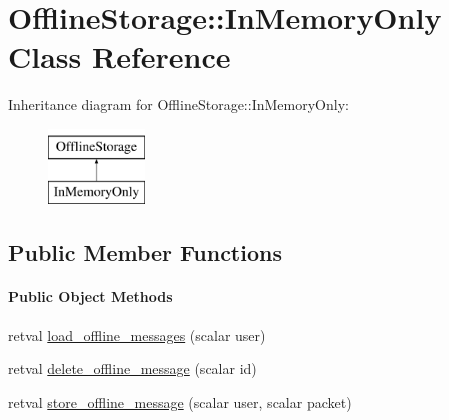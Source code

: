 \hypertarget{class_d_jabberd_1_1_delivery_1_1_offline_storage_1_1_in_memory_only}{
\section{\-Offline\-Storage\-:\-:\-In\-Memory\-Only \-Class \-Reference}
\label{class_d_jabberd_1_1_delivery_1_1_offline_storage_1_1_in_memory_only}
}
\-Inheritance diagram for \-Offline\-Storage\-:\-:\-In\-Memory\-Only\-:\begin{figure}[H]
\begin{center}
\leavevmode
\includegraphics[height=2.000000cm]{class_d_jabberd_1_1_delivery_1_1_offline_storage_1_1_in_memory_only}
\end{center}
\end{figure}
\subsection*{\-Public \-Member \-Functions}
\begin{Indent}\paragraph*{\-Public \-Object \-Methods}
\begin{DoxyCompactItemize}
\item 
retval \hyperlink{class_d_jabberd_1_1_delivery_1_1_offline_storage_1_1_in_memory_only_a33b1c9c88245c2a5b802a9bddc7f1fd5}{load\-\_\-offline\-\_\-messages} (scalar user)
\item 
retval \hyperlink{class_d_jabberd_1_1_delivery_1_1_offline_storage_1_1_in_memory_only_a3c24aee0bb330b52ce56a14e5233b9ed}{delete\-\_\-offline\-\_\-message} (scalar id)
\item 
retval \hyperlink{class_d_jabberd_1_1_delivery_1_1_offline_storage_1_1_in_memory_only_a5089899f4cc5720d932324fc41a22154}{store\-\_\-offline\-\_\-message} (scalar user, scalar packet)
\end{DoxyCompactItemize}
\end{Indent}


